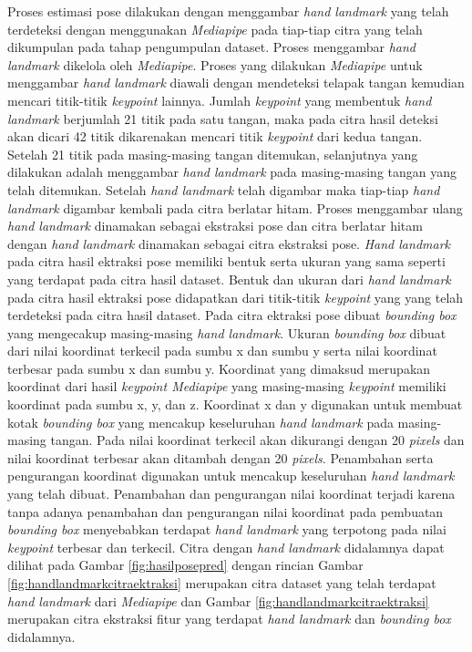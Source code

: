 Proses estimasi pose dilakukan dengan menggambar \emph{hand landmark} yang telah terdeteksi dengan menggunakan \emph{Mediapipe} pada tiap-tiap citra yang telah dikumpulan pada tahap pengumpulan dataset. Proses menggambar \emph{hand landmark} dikelola oleh \emph{Mediapipe}. Proses yang dilakukan \emph{Mediapipe} untuk menggambar \emph{hand landmark} diawali dengan mendeteksi telapak tangan kemudian mencari titik-titik \emph{keypoint} lainnya. Jumlah \emph{keypoint} yang membentuk \emph{hand landmark} berjumlah 21 titik pada satu tangan, maka pada citra hasil deteksi akan dicari 42 titik dikarenakan mencari titik \emph{keypoint} dari kedua tangan. Setelah 21 titik pada masing-masing tangan ditemukan, selanjutnya yang dilakukan adalah menggambar \emph{hand landmark} pada masing-masing tangan yang telah ditemukan. Setelah \emph{hand landmark} telah digambar maka tiap-tiap \emph{hand landmark} digambar kembali pada citra berlatar hitam. Proses menggambar ulang \emph{hand landmark} dinamakan sebagai ekstraksi pose dan citra berlatar hitam dengan \emph{hand landmark} dinamakan sebagai citra ekstraksi pose. \emph{Hand landmark} pada citra hasil ektraksi pose memiliki bentuk serta ukuran yang sama seperti yang terdapat pada citra hasil dataset. Bentuk dan ukuran dari \emph{hand landmark} pada citra hasil ektraksi pose didapatkan dari titik-titik \emph{keypoint} yang yang telah terdeteksi pada citra hasil dataset. Pada citra ektraksi pose dibuat \emph{bounding box} yang mengecakup masing-masing \emph{hand landmark}. Ukuran \emph{bounding box} dibuat dari nilai koordinat terkecil pada sumbu x dan sumbu y serta nilai koordinat terbesar pada sumbu x dan sumbu y. Koordinat yang dimaksud merupakan koordinat dari hasil \emph{keypoint Mediapipe} yang masing-masing \emph{keypoint} memiliki koordinat pada sumbu x, y, dan z. Koordinat x dan y digunakan untuk membuat kotak \emph{bounding box} yang mencakup keseluruhan \emph{hand landmark} pada masing-masing tangan. Pada nilai koordinat terkecil akan dikurangi dengan 20 \emph{pixels} dan nilai koordinat terbesar akan ditambah dengan 20 \emph{pixels}. Penambahan serta pengurangan koordinat digunakan untuk mencakup keseluruhan \emph{hand landmark} yang telah dibuat. Penambahan dan pengurangan nilai koordinat terjadi karena tanpa adanya penambahan dan pengurangan nilai koordinat pada pembuatan \emph{bounding box} menyebabkan terdapat \emph{hand landmark} yang terpotong pada nilai \emph{keypoint} terbesar dan terkecil. Citra dengan \emph{hand landmark} didalamnya dapat dilihat pada Gambar \ref{fig:hasilposepred} dengan rincian Gambar \ref{fig:handlandmarkcitraektraksi} merupakan citra dataset yang telah terdapat \emph{hand landmark} dari \emph{Mediapipe} dan Gambar \ref{fig:handlandmarkcitraektraksi} merupakan citra ekstraksi fitur yang terdapat \emph{hand landmark} dan \emph{bounding box} didalamnya. 

